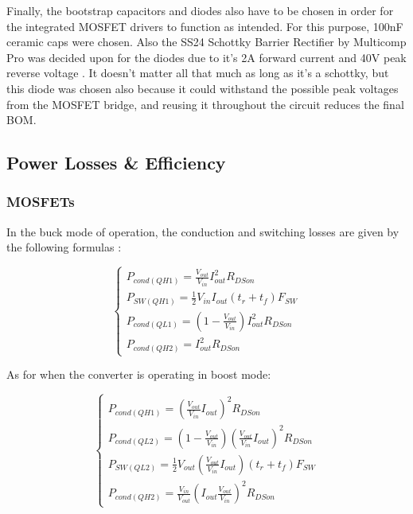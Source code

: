\documentclass[11pt, a4paper]{article}
\begin{document}
Finally, the bootstrap capacitors and diodes also have to be chosen in order for the integrated MOSFET drivers to function as intended. For this purpose, 100nF ceramic caps were chosen. Also the SS24 Schottky Barrier Rectifier by Multicomp Pro was decided upon for the diodes due to it's 2A forward current and 40V peak reverse voltage \cite{SS24data}. It doesn't matter all that much as long as it's a schottky, but this diode was chosen also because it could withstand the possible peak voltages from the MOSFET bridge, and reusing it throughout the circuit reduces the final BOM. 

\subsection{Power Losses \& Efficiency}

\subsubsection{MOSFETs}

In the buck mode of operation, the conduction and switching losses are given by the following formulas \cite{lm7175data}:

\begin{equation}
    \begin{cases}
        P_{cond(QH1)} = \frac{V_{out}}{V_{in}}I_{out}^2 R_{DSon} \\
        P_{SW(QH1)} = \frac{1}{2}V_{in}I_{out}(t_r + t_f)F_{SW} \\
        P_{cond(QL1)} = \left (1-\frac{V_{out}}{V_{in}} \right ) I_{out}^2 R_{DSon} \\
        P_{cond(QH2)} = I_{out}^2R_{DSon}
    \end{cases}
\end{equation}

As for when the converter is operating in boost mode:

\begin{equation}
    \begin{cases}
        P_{cond(QH1)} = \left (\frac{V_{out}}{V_{in}}I_{out} \right )^2 R_{DSon} \\
        P_{cond(QL2)} = \left (1 - \frac{V_{out}}{V_{in}}\right ) \left (\frac{V_{out}}{V_{in}}I_{out} \right )^2 R_{DSon} \\
        P_{SW(QL2)} = \frac{1}{2}V_{out}\left (\frac{V_{out}}{V_{in}}I_{out} \right )(t_r + t_f)F_{SW} \\
        P_{cond(QH2)} = \frac{V_{in}}{V_{out}}\left (I_{out}\frac{V_{out}}{V_{in}} \right )^2 R_{DSon}
    \end{cases}
\end{equation}
\end{document}

